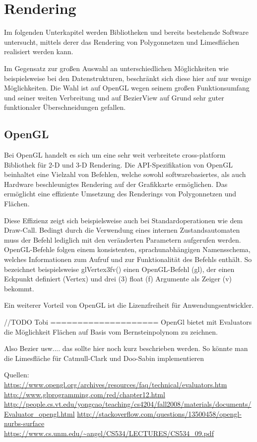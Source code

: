 \section{Rendering}

Im folgenden Unterkapitel werden Bibliotheken und bereits bestehende Software untersucht, mittels derer das Rendering von Polygonnetzen und Limesflächen realisiert werden kann.

Im Gegensatz zur großen Auswahl an unterschiedlichen Möglichkeiten wie beispielsweise bei den Datenstrukturen, beschränkt sich diese hier auf nur wenige Möglichkeiten. Die Wahl ist auf OpenGL wegen seinem großen Funktionsumfang und seiner weiten Verbreitung und auf BezierView auf Grund sehr guter funktionaler Überschneidungen gefallen.


\subsection{OpenGL}

Bei OpenGL handelt es sich um eine sehr weit verbreitete cross-platform Bibliothek für 2-D und 3-D Rendering.
Die API-Spezifikation von OpenGL beinhaltet eine Vielzahl von Befehlen, welche sowohl softwarebasiertes, als auch Hardware beschleunigtes Rendering auf der Grafikkarte ermöglichen. Das ermöglicht eine effiziente Umsetzung des Renderings von Polygonnetzen und Flächen.

Diese Effizienz zeigt sich beispielsweise auch bei Standardoperationen wie dem Draw-Call. Bedingt durch die Verwendung eines internen Zustandsautomaten muss der Befehl lediglich mit den veränderten Parametern aufgerufen werden. OpenGL-Befehle folgen einem konsistenten, sprachunabhängigen Namensschema, welches Informationen zum Aufruf und zur Funktionalität des Befehls enthält. So bezeichnet beispielsweise glVertex3fv() einen OpenGL-Befehl (gl), der einen Eckpunkt definiert (Vertex) und drei (3) float (f) Argumente als Zeiger (v) bekommt.

Ein weiterer Vorteil von OpenGL ist die Lizenzfreiheit für Anwendungsentwickler.

//TODO Tobi ====================
OpenGl bietet mit Evaluators die Möglichkeit Flächen auf Basis vom Bernsteinpolynom zu zeichnen.

Also Bezier usw.... das sollte hier noch kurz beschrieben werden.
So könnte man die Limesfläche für Catmull-Clark und Doo-Sabin implementieren

Quellen:
\url{https://www.opengl.org/archives/resources/faq/technical/evaluators.htm}
\url{http://www.glprogramming.com/red/chapter12.html}
\url{http://people.cs.vt.edu/yongcao/teaching/cs4204/fall2008/materials/documents/Evaluator_opengl.html}
\url{http://stackoverflow.com/questions/13500458/opengl-nurbs-surface}
\url{https://www.cs.unm.edu/~angel/CS534/LECTURES/CS534_09.pdf}

